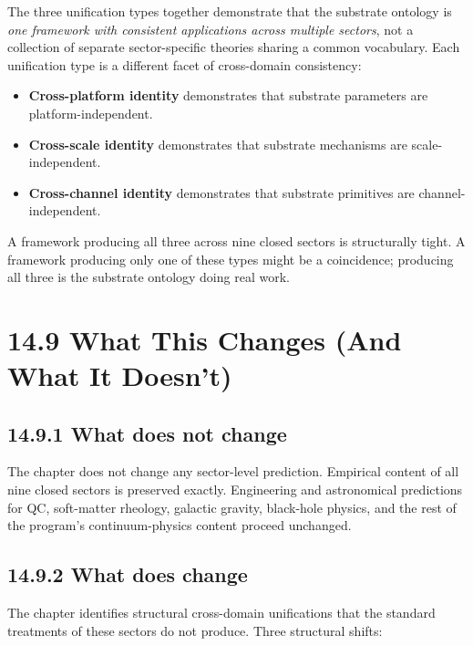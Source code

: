 \documentclass[11pt]{book}
\begin{document}
The three unification types together demonstrate that the substrate ontology is \textit{one framework with consistent applications across multiple sectors}, not a collection of separate sector-specific theories sharing a common vocabulary. Each unification type is a different facet of cross-domain consistency:

\begin{itemize}
\item \textbf{Cross-platform identity} demonstrates that substrate parameters are platform-independent.
\item \textbf{Cross-scale identity} demonstrates that substrate mechanisms are scale-independent.
\item \textbf{Cross-channel identity} demonstrates that substrate primitives are channel-independent.
\end{itemize}

A framework producing all three across nine closed sectors is structurally tight. A framework producing only one of these types might be a coincidence; producing all three is the substrate ontology doing real work.

\section{14.9 What This Changes (And What It Doesn't)}

\subsection{14.9.1 What does not change}

The chapter does not change any sector-level prediction. Empirical content of all nine closed sectors is preserved exactly. Engineering and astronomical predictions for QC, soft-matter rheology, galactic gravity, black-hole physics, and the rest of the program's continuum-physics content proceed unchanged.

\subsection{14.9.2 What does change}

The chapter identifies structural cross-domain unifications that the standard treatments of these sectors do not produce. Three structural shifts:
\end{document}

